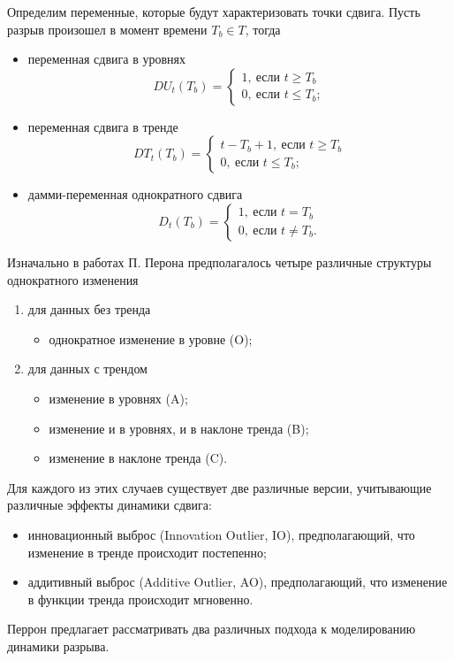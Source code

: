 \documentclass[a4paper, 14pt]{extreport}
\numberwithin{equation}{section}
\renewcommand{\leq}{\leqslant}
\renewcommand{\geq}{\geqslant}
\numberwithin{equation}{section}
\begin{document}
	Определим переменные, которые будут характеризовать точки сдвига. Пусть разрыв произошел в момент времени $T_b \in T$, тогда
	\begin{itemize}
		\item переменная сдвига в уровнях
		\begin{equation}
			DU_t(T_b)=
		\begin{cases}
			1, \ \text{если } t\geq T_b\\
			0,\ \text{если } t\leq T_b;
		\end{cases}
		\end{equation}
		\item переменная сдвига в тренде
		\begin{equation}
		DT_t(T_b)=
		\begin{cases}
			t-T_b+1, \ \text{если } t\geq T_b\\
			0,\ \text{если } t\leq T_b;
		\end{cases}
		\end{equation}
		\item дамми-переменная однократного сдвига
		\begin{equation}
			D_t(T_b)=
			\begin{cases}
				1, \ \text{если } t= T_b\\
				0,\ \text{если } t\ne T_b.
			\end{cases}
		\end{equation}
	\end{itemize}
	
	
	Изначально в работах П. Перона предполагалось четыре различные структуры однократного изменения
	\begin{enumerate}
		\item для данных без тренда
		\begin{itemize}
			\item однократное изменение в уровне (O);
		\end{itemize}
		\item для данных с трендом
		\begin{itemize}
		\item изменение в уровнях (A);
		\item изменение и в уровнях, и в наклоне тренда (B);
		\item изменение в наклоне тренда (C).
		\end{itemize}
	\end{enumerate}
	
	Для каждого из этих случаев существует две различные версии, учитывающие различные эффекты динамики сдвига:
	\begin{itemize}
		\item инновационный выброс (Innovation Outlier, IO), предполагающий, что изменение в тренде происходит постепенно;
		\item аддитивный выброс (Additive Outlier, AO), предполагающий, что изменение в функции тренда происходит мгновенно.
	\end{itemize}
	Перрон предлагает рассматривать два различных подхода к моделированию динамики разрыва.	
	
\end{document}
